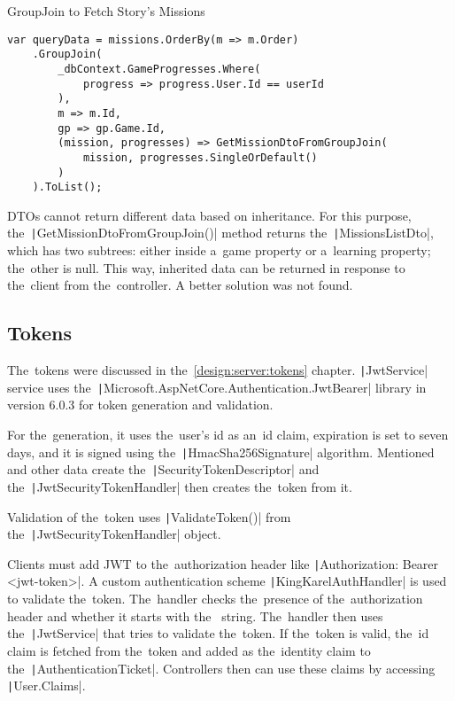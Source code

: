 \begin{listing}
    \caption{GroupJoin to Fetch Story's Missions}
    \label{listing:groupjoin}
    \begin{verbatim}
var queryData = missions.OrderBy(m => m.Order)
    .GroupJoin(
        _dbContext.GameProgresses.Where(
            progress => progress.User.Id == userId
        ),
        m => m.Id,
        gp => gp.Game.Id,
        (mission, progresses) => GetMissionDtoFromGroupJoin(
            mission, progresses.SingleOrDefault()
        )
    ).ToList();
    \end{verbatim}
\end{listing}

DTOs cannot return different data based on inheritance.
For this purpose, the~\texttt|GetMissionDtoFromGroupJoin()| method returns the~\texttt|MissionsListDto|, which has two subtrees: either inside a~game property or a~learning property; the~other is null.
This way, inherited data can be returned in response to the~client from the~controller.
A better solution was not found.

\subsection{Tokens}

The~tokens were discussed in the~\ref{design:server:tokens} chapter.
\texttt|JwtService| service uses the~\texttt|Microsoft.AspNetCore.Authentication.JwtBearer| library in version 6.0.3 for token generation and validation.

For the~generation, it uses the~user's id as an~id claim, expiration is set to seven days, and it is signed using the~\texttt|HmacSha256Signature| algorithm.
Mentioned and other data create the~\texttt|SecurityTokenDescriptor| and the~\texttt|JwtSecurityTokenHandler| then creates the~token from it.

Validation of the~token uses \texttt|ValidateToken()| from the~\linebreak\texttt|JwtSecurityTokenHandler| object.

Clients must add JWT to the~authorization header like \linebreak\texttt|Authorization: Bearer <jwt-token>|.
A custom authentication scheme \linebreak\texttt|KingKarelAuthHandler| is used to validate the~token.
The~handler checks the~presence of the~authorization header and whether it starts with the~ string.
The~handler then uses the~\texttt|JwtService| that tries to validate the~token.
If the~token is valid, the~id claim is fetched from the~token and added as the~identity claim to the~\texttt|AuthenticationTicket|.
Controllers then can use these claims by accessing \texttt|User.Claims|.

